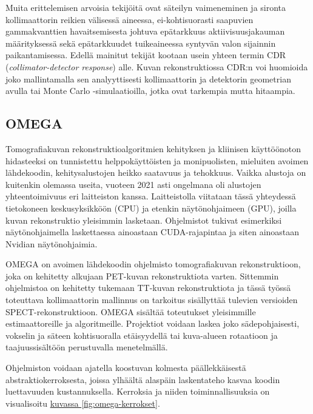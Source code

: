 Muita erittelemisen arvoisia tekijöitä ovat säteilyn vaimeneminen ja sironta kollimaattorin reikien välisessä aineessa, ei-kohtisuorasti saapuvien gammakvanttien havaitsemisesta johtuva epätarkkuus aktiivisuusjakauman määrityksessä sekä epätarkkuudet tuikeaineessa syntyvän valon sijainnin paikantamisessa\cite{king_attenuation_2004, frey_collimator-detector_2006}. Edellä mainitut tekijät kootaan usein yhteen termin CDR (\textit{collimator-detector response}) alle. Kuvan rekonstruktiossa CDR:n voi huomioida joko mallintamalla sen analyyttisesti kollimaattorin ja detektorin geometrian avulla tai Monte Carlo -simulaatioilla, jotka ovat tarkempia mutta hitaampia.\cite{frey_collimator-detector_2006}

\subsection{OMEGA}
Tomografiakuvan rekonstruktioalgoritmien kehityksen ja kliinisen käyttöönoton hidasteeksi on tunnistettu helppokäyttöisten ja monipuolisten, mieluiten avoimen lähdekoodin, kehitysalustojen heikko saatavuus ja tehokkuus\cite{hutton_origins_2014}. Vaikka alustoja on kuitenkin olemassa useita, vuoteen 2021 asti ongelmana oli alustojen yhteentoimivuus eri laitteiston kanssa. Laitteistolla viitataan tässä yhteydessä tietokoneen keskusyksikköön (CPU) ja etenkin näytönohjaimeen (GPU), joilla kuvan rekonstruktio yleisimmin lasketaan. Ohjelmistot tukivat esimerkiksi näytönohjaimella laskettaessa ainoastaan CUDA-rajapintaa ja siten ainoastaan Nvidian näytönohjaimia.\cite{wettenhovi_omegaopen-source_2021}

OMEGA on avoimen lähdekoodin ohjelmisto tomografiakuvan rekonstruktioon, joka on kehitetty alkujaan PET-kuvan rekonstruktiota varten\cite{wettenhovi_omegaopen-source_2021, wettenhovi_transmission_2021}. Sittemmin ohjelmistoa on kehitetty tukemaan TT-kuvan rekonstruktiota\cite{wettenhovi_transmission_2021} ja tässä työssä toteuttava kollimaattorin mallinnus on tarkoitus sisällyttää tulevien versioiden SPECT-rekonstruktioon. OMEGA sisältää toteutukset yleisimmille estimaattoreille ja algoritmeille. Projektiot voidaan laskea joko sädepohjaisesti\cite{siddon_fast_1985, sundermann_fast_1998}, vokselin ja säteen kohtisuoralla etäisyydellä\cite{aguiar_geometrical_2010} tai kuva-alueen rotaatioon ja taajuussisältöön perustuvalla menetelmällä\cite{zeng_frequency_1992, zeng_rotating_1994}.\cite{wettenhovi_omegaopen-source_2021}

Ohjelmiston voidaan ajatella koostuvan kolmesta päällekkäisestä abstraktiokerroksesta, joissa ylhäältä alaspäin laskentateho kasvaa koodin luettavuuden kustannuksella. Kerroksia ja niiden toiminnallisuuksia on visualisoitu \hyperref[fig:omega-kerrokset]{kuvassa \ref*{fig:omega-kerrokset}}.

